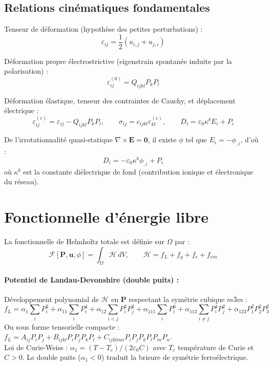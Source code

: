 \documentclass[11pt, a4paper]{article}
\begin{document}
\subsection{Relations cinématiques fondamentales}

Tenseur de déformation (hypothèse des petites perturbations) :
\begin{equation}
\varepsilon_{ij} = \frac{1}{2}(u_{i,j} + u_{j,i})
\end{equation}

Déformation propre électrostrictive (eigenstrain spontanée induite par la polarisation) :
\begin{equation}
\varepsilon^{(0)}_{ij} = Q_{ijkl}P_k P_l
\end{equation}

Déformation élastique, tenseur des contraintes de Cauchy, et déplacement électrique :
\begin{equation}
\varepsilon^{(e)}_{ij} = \varepsilon_{ij} - Q_{ijkl}P_k P_l, \qquad \sigma_{ij} = c_{ijkl}\varepsilon^{(e)}_{kl}, \qquad D_i = \varepsilon_0\kappa^b E_i + P_i
\end{equation}

De l'irrotationnalité quasi-statique $\nabla \times \mathbf{E} = \mathbf{0}$, il existe $\phi$ tel que $E_i = -\phi_{,i}$, d'où :
\begin{equation}
D_i = -\varepsilon_0\kappa^b\phi_{,i} + P_i
\end{equation}
où $\kappa^b$ est la constante diélectrique de fond (contribution ionique et électronique du réseau).

\section{Fonctionnelle d'énergie libre}

La fonctionnelle de Helmholtz totale est définie sur $\Omega$ par :
\begin{equation}
\mathcal{F}[\mathbf{P},\mathbf{u},\phi] = \int_\Omega \mathcal{H} \, dV, \qquad \mathcal{H} = f_L + f_g + f_e + f_{em}
\end{equation}

\paragraph{Potentiel de Landau-Devonshire (double puits) :}
Développement polynomial de $\mathcal{H}$ en $\mathbf{P}$ respectant la symétrie cubique $m\bar{3}m$ :
\begin{equation}
f_L = \alpha_1\sum_i P_i^2 + \alpha_{11}\sum_i P_i^4 + \alpha_{12}\sum_{i < j}P_i^2 P_j^2 + \alpha_{111}\sum_i P_i^6 + \alpha_{112}\sum_{i\neq j}P_i^4 P_j^2 + \alpha_{123}P_1^2 P_2^2 P_3^2
\end{equation}
Ou sous forme tensorielle compacte : $f_L = A_{ij}P_iP_j + B_{ijkl}P_iP_jP_kP_l + C_{ijklmn}P_iP_jP_kP_lP_mP_n$. \\
Loi de Curie-Weiss : $\alpha_1 = (T - T_c)/(2\varepsilon_0 C)$ avec $T_c$ température de Curie et $C > 0$. Le double puits ($\alpha_1 < 0$) traduit la brisure de symétrie ferroélectrique.
\end{document}
